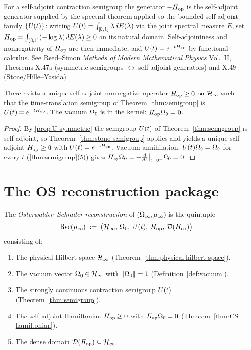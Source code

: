 For a self-adjoint contraction semigroup the generator $-H_{\mathrm{op}}$ is the
self-adjoint generator supplied by the spectral theorem applied to the
bounded self-adjoint family $\{U(t)\}$: writing
$U(t) = \int_{[0,1]} \lambda \, dE(\lambda)$ via the joint spectral
measure $E$, set $H_{\mathrm{op}} = \int_{(0,1]} (-\log \lambda)\, dE(\lambda)
\ge 0$ on its natural domain.  Self-adjointness and nonnegativity of
$H_{\mathrm{op}}$ are then immediate, and $U(t) = e^{-tH_{\mathrm{op}}}$ by functional
calculus.  See Reed--Simon \emph{Methods of Modern Mathematical
Physics} Vol.~II, Theorems X.47a (symmetric semigroups $\leftrightarrow$
self-adjoint generators) and X.49 (Stone/Hille--Yosida).

\begin{theorem}
\label{thm:OS-hamiltonian}
There exists a unique self-adjoint nonnegative operator
$H_{\mathrm{op}} \ge 0$ on $\mathcal{H}_\infty$ such that the time-translation semigroup
of Theorem~\ref{thm:semigroup} is $U(t) = e^{-t H_{\mathrm{op}}}$.  The vacuum
$\Omega_0$ is in the kernel: $H_{\mathrm{op}} \Omega_0 = 0$.
\end{theorem}

\begin{proof}
By \cref{prop:U-symmetric} the semigroup $U(t)$ of
Theorem~\ref{thm:semigroup} is self-adjoint, so
Theorem~\ref{thm:stone-semigroup} applies and yields a unique
self-adjoint $H_{\mathrm{op}} \ge 0$ with $U(t) = e^{-tH_{\mathrm{op}}}$.
Vacuum-annihilation: $U(t) \Omega_0 = \Omega_0$ for every $t$
(\cref{thm:semigroup}(5)) gives
$H_{\mathrm{op}} \Omega_0 = -\frac{d}{dt}\big|_{t=0^+} \Omega_0 = 0$.
\end{proof}

\section{The OS reconstruction package}
\label{sec:package}

\begin{definition}
\label{def:os-reconstruction}
The \emph{Osterwalder--Schrader reconstruction} of $(\Omega_\infty, \mu_\infty)$
is the quintuple
\begin{equation*}
  \mathrm{Rec}(\mu_\infty) \;:=\; \bigl( \mathcal{H}_\infty, \; \Omega_0, \; U(t), \; H_{\mathrm{op}}, \; \mathcal{D}(H_{\mathrm{op}}) \bigr)
\end{equation*}
consisting of:
\begin{enumerate}
  \item The physical Hilbert space $\mathcal{H}_\infty$ (Theorem~\ref{thm:physical-hilbert-space}).
  \item The vacuum vector $\Omega_0 \in \mathcal{H}_\infty$ with
    $\|\Omega_0\| = 1$ (Definition~\ref{def:vacuum}).
  \item The strongly continuous contraction semigroup $U(t)$
    (Theorem~\ref{thm:semigroup}).
  \item The self-adjoint Hamiltonian $H_{\mathrm{op}} \ge 0$ with
    $H_{\mathrm{op}} \Omega_0 = 0$ (Theorem~\ref{thm:OS-hamiltonian}).
  \item The dense domain $\mathcal{D}(H_{\mathrm{op}}) \subseteq \mathcal{H}_\infty$.
\end{enumerate}
\end{definition}

